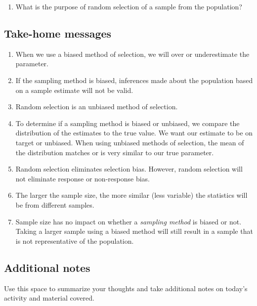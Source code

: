 \documentclass[
]{report}
\providecommand{\tightlist}{%
  \setlength{\itemsep}{0pt}\setlength{\parskip}{0pt}}
\begin{document}
\begin{enumerate}
\def\labelenumi{\arabic{enumi}.}
\setcounter{enumi}{14}
\tightlist
\item
  What is the purpose of random selection of a sample from the population?
\end{enumerate}

\vspace{0.8in}

\newpage

\subsection{Take-home messages}\label{take-home-messages-1}

\begin{enumerate}
\def\labelenumi{\arabic{enumi}.}
\item
  When we use a biased method of selection, we will over or underestimate the parameter.
\item
  If the sampling method is biased, inferences made about the population based on a sample estimate will not be valid.
\item
  Random selection is an unbiased method of selection.
\item
  To determine if a sampling method is biased or unbiased, we compare the distribution of the estimates to the true value. We want our estimate to be on target or unbiased. When using unbiased methods of selection, the mean of the distribution matches or is very similar to our true parameter.
\item
  Random selection eliminates selection bias. However, random selection will not eliminate response or non-response bias.
\item
  The larger the sample size, the more similar (less variable) the statistics will be from different samples.
\item
  Sample size has no impact on whether a \emph{sampling method} is biased or not. Taking a larger sample using a biased method will still result in a sample that is not representative of the population.
\end{enumerate}

\subsection{Additional notes}\label{additional-notes-1}

Use this space to summarize your thoughts and take additional notes on today's activity and material covered.
\end{document}
